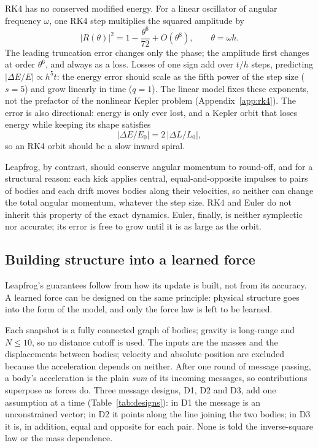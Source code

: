 \documentclass[a4paper,journal]{IEEEtran}
\begin{document}
RK4 has no conserved modified energy. For a linear oscillator of angular frequency $\omega$, one RK4 step multiplies the squared amplitude by
\begin{equation}
|R(\theta)|^2=1-\frac{\theta^6}{72}+O(\theta^8),\qquad\theta=\omega h .
\end{equation}
The leading truncation error changes only the phase; the amplitude first changes at order $\theta^6$, and always as a loss. Losses of one sign add over $t/h$ steps, predicting $|\Delta E/E|\propto h^5t$: the energy error should scale as the fifth power of the step size ($s=5$) and grow linearly in time ($q=1$). The linear model fixes these exponents, not the prefactor of the nonlinear Kepler problem (Appendix~\ref{app:rk4}). The error is also directional: energy is only ever lost, and a Kepler orbit that loses energy while keeping its shape satisfies
\begin{equation}
|\Delta E/E_0|=2\,|\Delta L/L_0| ,
\label{eq:spiral}
\end{equation}
so an RK4 orbit should be a slow inward spiral.

Leapfrog, by contrast, should conserve angular momentum to round-off, and for a structural reason: each kick applies central, equal-and-opposite impulses to pairs of bodies and each drift moves bodies along their velocities, so neither can change the total angular momentum, whatever the step size. RK4 and Euler do not inherit this property of the exact dynamics. Euler, finally, is neither symplectic nor accurate; its error is free to grow until it is as large as the orbit.

\subsection{Building structure into a learned force}\label{sec:thgnn}

Leapfrog's guarantees follow from how its update is built, not from its accuracy. A learned force can be designed on the same principle: physical structure goes into the form of the model, and only the force law is left to be learned.

Each snapshot is a fully connected graph of bodies; gravity is long-range and $N\le10$, so no distance cutoff \cite{SanchezGonzalez2020} is used. The inputs are the masses and the displacements between bodies; velocity and absolute position are excluded because the acceleration depends on neither. After one round of message passing, a body's acceleration is the plain \emph{sum} of its incoming messages, so contributions superpose as forces do. Three message designs, D1, D2 and D3, add one assumption at a time (Table~\ref{tab:designs}): in D1 the message is an unconstrained vector; in D2 it points along the line joining the two bodies; in D3 it is, in addition, equal and opposite for each pair. None is told the inverse-square law or the mass dependence.
\end{document}

